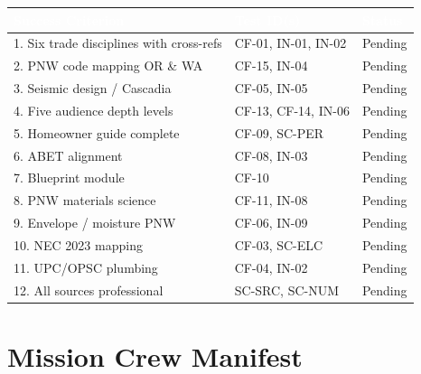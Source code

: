 \documentclass[11pt,letterpaper]{article}
\newcommand{\tableheader}[1]{\textbf{\sffamily\textcolor{white}{#1}}}
\begin{document}
\begin{center}
\begin{tabularx}{\textwidth}{XL{3cm}C{1.5cm}}
\toprule
{}
\tableheader{Success Criterion} & \tableheader{Test ID(s)} & \tableheader{Status} \\
. Six trade disciplines with cross-refs & CF-01, IN-01, IN-02 & Pending \\
2. PNW code mapping OR \& WA & CF-15, IN-04 & Pending \\
3. Seismic design / Cascadia & CF-05, IN-05 & Pending \\
4. Five audience depth levels & CF-13, CF-14, IN-06 & Pending \\
5. Homeowner guide complete & CF-09, SC-PER & Pending \\
6. ABET alignment & CF-08, IN-03 & Pending \\
7. Blueprint module & CF-10 & Pending \\
8. PNW materials science & CF-11, IN-08 & Pending \\
9. Envelope / moisture PNW & CF-06, IN-09 & Pending \\
10. NEC 2023 mapping & CF-03, SC-ELC & Pending \\
11. UPC/OPSC plumbing & CF-04, IN-02 & Pending \\
12. All sources professional & SC-SRC, SC-NUM & Pending \\
\bottomrule
\end{tabularx}
\end{center}

\section{Mission Crew Manifest}
\end{document}
